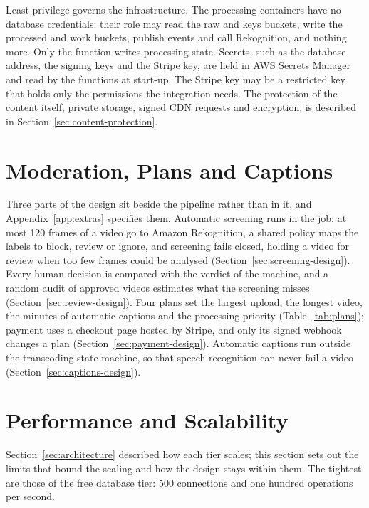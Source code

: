 Least privilege governs the infrastructure. The processing containers have no database credentials:
their role may read the raw and keys buckets, write the processed and work buckets, publish events
and call Rekognition, and nothing more. Only the  function writes processing state.
Secrets, such as the database address, the signing keys and the Stripe key, are held in AWS Secrets
Manager and read by the functions at start-up. The Stripe key may be a restricted key that holds only
the permissions the integration needs. The protection of the content itself, private storage, signed CDN
requests and encryption, is described in Section~\ref{sec:content-protection}.

\section{Moderation, Plans and Captions}
\label{sec:extras-design}

Three parts of the design sit beside the pipeline rather than in it, and Appendix~\ref{app:extras}
specifies them. Automatic screening runs in the  job: at most 120 frames of a video go
to Amazon Rekognition, a shared policy maps the labels to block, review or ignore, and screening
fails closed, holding a video for review when too few frames could be analysed
(Section~\ref{sec:screening-design}). Every human decision is compared with the verdict of the
machine, and a random audit of approved videos estimates what the screening misses
(Section~\ref{sec:review-design}). Four plans set the largest upload, the longest video, the minutes
of automatic captions and the processing priority (Table~\ref{tab:plans}); payment uses a checkout page
hosted by Stripe, and only its signed webhook changes a plan (Section~\ref{sec:payment-design}).
Automatic captions run outside the transcoding state machine, so that speech recognition can never
fail a video (Section~\ref{sec:captions-design}).

\section{Performance and Scalability}
\label{sec:performance-design}

Section~\ref{sec:architecture} described how each tier scales; this section sets out the limits
that bound the scaling and how the design stays within them. The tightest are those of the free
database tier: 500 connections and one hundred operations per second.

